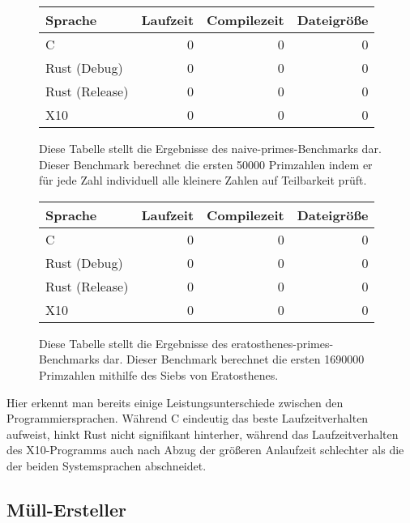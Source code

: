 \begin{figure}[hb]
	\begin{center}
		\begin{tabular}{lrrr}
			\toprule
			Sprache & Laufzeit & Compilezeit & Dateigröße \\
			\midrule
			C & 0 & 0 & 0 \\
			Rust (Debug) & 0 & 0 & 0 \\
			Rust (Release) & 0 & 0 & 0 \\
			X10 & 0 & 0 & 0 \\
			\bottomrule
		\end{tabular}
	\end{center}
	\caption{
		Diese Tabelle stellt die Ergebnisse des naive-primes-Benchmarks dar. Dieser Benchmark berechnet die ersten 50000 Primzahlen
		indem er für jede Zahl individuell alle kleinere Zahlen auf Teilbarkeit prüft.
	}
	\label{fig:primes_naive_table}
\end{figure}

\begin{figure}[hb]
	\begin{center}
		\begin{tabular}{lrrr}
			\toprule
			Sprache & Laufzeit & Compilezeit & Dateigröße \\
			\midrule
			C & 0 & 0 & 0 \\
			Rust (Debug) & 0 & 0 & 0 \\
			Rust (Release) & 0 & 0 & 0 \\
			X10 & 0 & 0 & 0 \\
			\bottomrule
		\end{tabular}
	\end{center}
	\caption{
		Diese Tabelle stellt die Ergebnisse des eratosthenes-primes-Benchmarks dar. Dieser Benchmark berechnet die ersten 1690000
		Primzahlen mithilfe des Siebs von Eratosthenes.
	}
	\label{fig:primes_eratosthenes_table}
\end{figure}


Hier erkennt man bereits einige Leistungsunterschiede zwischen den Programmiersprachen. Während C eindeutig das
beste Laufzeitverhalten aufweist, hinkt Rust nicht signifikant hinterher, während das Laufzeitverhalten des X10-Programms auch
nach Abzug der größeren Anlaufzeit schlechter als die der beiden Systemsprachen abschneidet.


\subsection{Müll-Ersteller}

